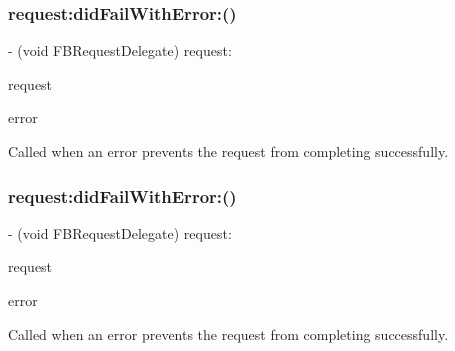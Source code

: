 \subsubsection{\texorpdfstring{request\+:did\+Fail\+With\+Error\+:()}{request:didFailWithError:()}\hspace{0.1cm}{\footnotesize\ttfamily [1/2]}}
{\footnotesize\ttfamily -\/ (void F\+B\+Request\+Delegate) request\+: \begin{DoxyParamCaption}\item[{(\hyperlink{interfaceFBRequest}{F\+B\+Request} $\ast$)}]{request }\item[{didFailWithError:(N\+S\+Error $\ast$)}]{error }\end{DoxyParamCaption}\hspace{0.3cm}{\ttfamily [optional]}}

Called when an error prevents the request from completing successfully. \mbox{\label{protocolFBRequestDelegate_01-p_af425dd2a4e632db3dee99db7e0ff6166}} 
\subsubsection{\texorpdfstring{request\+:did\+Fail\+With\+Error\+:()}{request:didFailWithError:()}\hspace{0.1cm}{\footnotesize\ttfamily [2/2]}}
{\footnotesize\ttfamily -\/ (void F\+B\+Request\+Delegate) request\+: \begin{DoxyParamCaption}\item[{(\hyperlink{interfaceFBRequest}{F\+B\+Request} $\ast$)}]{request }\item[{didFailWithError:(N\+S\+Error $\ast$)}]{error }\end{DoxyParamCaption}\hspace{0.3cm}{\ttfamily [optional]}}

Called when an error prevents the request from completing successfully. \mbox{\label{protocolFBRequestDelegate_01-p_a918115a5573611db01699d77852b314d}} 

